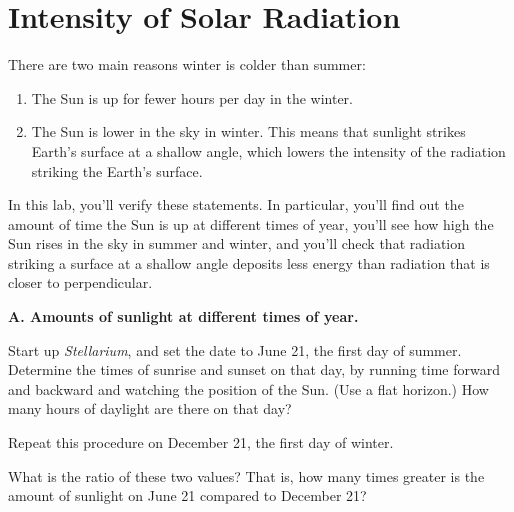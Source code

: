 


\chapter{Intensity of Solar Radiation}


There are two main reasons winter is colder than summer:
\begin{enumerate}
\item The Sun is up for fewer hours per day in the winter.
\item The Sun is lower in the sky in winter.  This means
that sunlight strikes Earth's surface at a shallow
angle, which lowers the intensity
of the radiation striking the Earth's surface.
\end{enumerate}

In this lab, you'll verify these statements. In particular,
you'll find out the amount of time the Sun is up at different
times of year,
you'll see how high the Sun rises in the sky in summer and winter,
and you'll check that radiation striking a surface at
a shallow angle deposits less energy than radiation that is
closer to perpendicular.

\bigskip

{\bf A. Amounts of sunlight at different times of year.} 

Start up \textit{Stellarium}, and set the date to June 21, the 
first day of summer. Determine the times of sunrise and sunset on that
day, by running time forward and backward and watching the position of the Sun.
(Use a flat horizon.)
How many hours of daylight are there on that day?

\vskip 1in

Repeat this procedure on December 21, the first day of winter.

\vskip 1in

What is the ratio of these two values? That is, how many times
greater is the amount of sunlight on June 21 compared to December 21?

\vskip 1in



